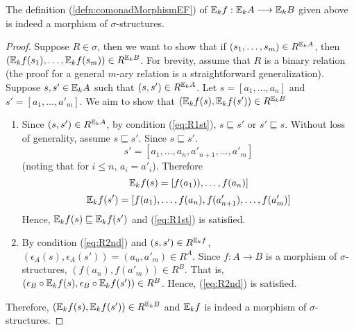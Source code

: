 \begin{prop}
The definition (\ref{defn:comonadMorphismEF}) of ${\mathbb{E}_{k}f}:{\mathbb{E}_{k}A} \longrightarrow {\mathbb{E}_{k}B}$ given above is indeed a morphism of $\sigma$-structures. 
\begin{proof}
Suppose $R \in \sigma$, then we want to show that if $(s_{1},\dots,s_{m}) \in R^{{\mathbb{E}_{k}A}}$, then \linebreak $({\mathbb{E}_{k}f}(s_{1}),\dots,{\mathbb{E}_{k}f}(s_{m})) \in R^{{\mathbb{E}_{k}B}}$. For brevity, assume that $R$ is a binary relation (the proof for a general $m$-ary relation is a straightforward generalization). Suppose $s,s' \in {\mathbb{E}_{k}A}$ such that $(s,s') \in R^{{\mathbb{E}_{k}A}}$. Let $s = [a_{1},\dots,a_{n}]$ and $s' = [a_{1},\dots,a'_{m}]$. We aim to show that $({\mathbb{E}_{k}f}(s),{\mathbb{E}_{k}f}(s')) \in R^{{\mathbb{E}_{k}B}}$ \\
\begin{enumerate}
\item  Since $(s,s') \in R^{{\mathbb{E}_{k}A}}$, by condition (\ref{eq:R1st}), $s \sqsubseteq s'$ or $s' \sqsubseteq s$. Without loss of generality, assume $s \sqsubseteq s'$. Since $s \sqsubseteq s'$.
$$s' = [a_{1},\dots,a_{n},a'_{n+1},\dots,a'_{m}]$$ 
(noting that for $i \leq n$, $a_{i} = a'_{i}$). Therefore $${\mathbb{E}_{k}f}(s) = [f(a_{1})),\dots,f(a_{n})]$$ 
$${\mathbb{E}_{k}f}(s') =[f(a_{1}),\dots,f(a_{n}),f(a'_{n+1}),\dots,f(a'_{m})]$$ 
Hence, ${\mathbb{E}_{k}f}(s) \sqsubseteq {\mathbb{E}_{k}f}(s')$ and (\ref{eq:R1st}) is satisfied. 
\item  By condition (\ref{eq:R2nd}) and $(s,s') \in R^{{\mathbb{E}_{k}f}}$, $(\epsilon_{A}(s),\epsilon_{A}(s')) = (a_{n},a'_{m}) \in R^{A}$. Since $f:A \rightarrow B$ is a morphism of $\sigma$-structures, $(f(a_{n}),f(a'_{m})) \in R^{B}$. That is, $(\epsilon_{B}\circ {\mathbb{E}_{k}f}(s),\epsilon_{B} \circ {\mathbb{E}_{k}f}(s')) \in R^{B}$. Hence, (\ref{eq:R2nd}) is satisfied.
\end{enumerate}
Therefore, $({\mathbb{E}_{k}f}(s),{\mathbb{E}_{k}f}(s')) \in R^{{\mathbb{E}_{k}B}}$ and ${\mathbb{E}_{k}f}$ is indeed a morphism of $\sigma$-structures. 
\end{proof}
\end{prop}
